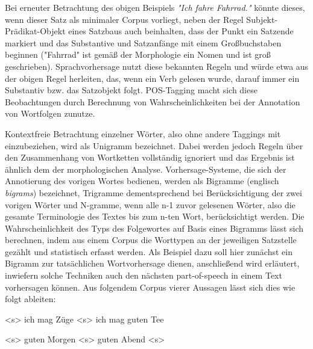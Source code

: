 \documentclass[12pt]{paper}
\begin{document}
Bei erneuter Betrachtung des obigen Beispiels \textit{"Ich fahre Fahrrad."} könnte dieses, wenn dieser Satz als minimaler Corpus vorliegt, neben der Regel Subjekt-Prädikat-Objekt eines Satzbaus auch beinhalten, dass der Punkt ein Satzende markiert und das Substantive und Satzanfänge mit einem Großbuchstaben beginnen ("Fahrrad" ist gemäß der Morphologie ein Nomen und ist groß geschrieben). Sprachvorhersage nutzt diese bekannten Regeln und würde etwa aus der obigen Regel herleiten, das, wenn ein Verb gelesen wurde, darauf immer ein Substantiv bzw. das Satzobjekt folgt. POS-Tagging macht sich diese Beobachtungen durch Berechnung von Wahrscheinlichkeiten bei der Annotation von Wortfolgen zunutze. 

Kontextfreie Betrachtung einzelner Wörter, also ohne andere Taggings mit einzubeziehen, wird als Unigramm bezeichnet. Dabei werden jedoch Regeln über den Zusammenhang von Wortketten vollständig ignoriert und das Ergebnis ist ähnlich dem der morphologischen Analyse. Vorhersage-Systeme, die sich der Annotierung des vorigen Wortes bedienen, werden als Bigramme (englisch \textit{bigrams}) bezeichnet, Trigramme dementsprechend bei Berücksichtigung der zwei vorigen Wörter und N-gramme, wenn alle n-1 zuvor gelesenen Wörter, also die gesamte Terminologie des Textes bis zum n-ten Wort, berücksichtigt werden.
Die Wahrscheinlichkeit des Typs des Folgewortes auf Basis eines Bigramms lässt sich berechnen, indem aus einem Corpus die Worttypen an der jeweiligen Satzstelle gezählt und statistisch erfasst werden. 
Als Beispiel dazu soll hier zunächst ein Bigramm zur tatsächlichen Wortvorhersage dienen, anschließend wird erläutert, inwiefern solche Techniken auch den nächsten part-of-speech in einem Text vorhersagen können. Aus folgendem Corpus vierer Aussagen lässt sich dies wie folgt ableiten:
\\ \tt

<s> ich mag Züge <s> ich mag guten Tee 


<s> guten Morgen <s> guten Abend <s>
\\ \rm
\end{document}
